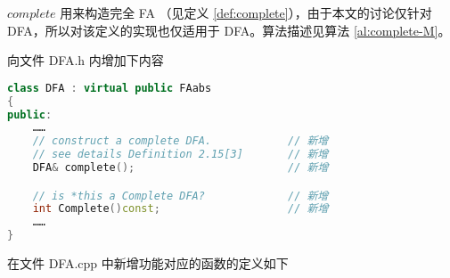 $complete$ 用来构造完全 FA （见定义 \ref{def:complete}），由于本文的讨论仅针对 DFA，所以对该定义的实现也仅适用于 DFA。算法描述见算法 \ref{al:complete-M}。

向文件 DFA.h 内增加下内容

\begin{lstlisting}[language=C++,label={lst:complete-def},caption={文件 DFA.h}]
class DFA : virtual public FAabs
{
public:
    ……
    // construct a complete DFA.            // 新增
    // see details Definition 2.15[3]       // 新增
    DFA& complete();                        // 新增

    // is *this a Complete DFA?             // 新增
    int Complete()const;                    // 新增
    ……
}
\end{lstlisting}
    
在文件 DFA.cpp 中新增功能对应的函数的定义如下
    
